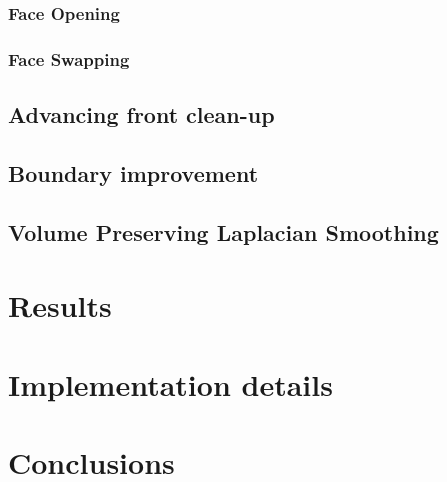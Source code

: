 \documentclass[11pt, a4paper]{paper}
\begin{document}
\subsubsection{ Face Opening }
\subsubsection{ Face Swapping }
\subsection { Advancing front clean-up}
\subsection { Boundary improvement}
\subsection { Volume Preserving Laplacian Smoothing}
\section {Results}
\section { Implementation details }

\section {Conclusions}
\end{document}
